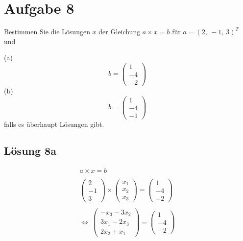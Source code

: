 \renewcommand{\arraystretch}{1.1}

\section{Aufgabe 8}

Bestimmen Sie die Lösungen $\displaystyle x$ der Gleichung $\displaystyle a\times x=b$ für $\displaystyle a=( 2,\ -1,\ 3)^{T}$ und

(a)
\begin{equation*}
  b=\begin{pmatrix}
    1\\
    -4\\
    -2
  \end{pmatrix}
\end{equation*}
(b)
\begin{equation*}
  b=\begin{pmatrix}
    1\\
    -4\\
    -1
  \end{pmatrix}
\end{equation*}
falls es überhaupt Lösungen gibt.

\subsection{Lösung 8a}

\begin{gather*}
  a\times x=b\\
  \\
  \begin{pmatrix}
    2\\
    -1\\
    3
  \end{pmatrix} \times \begin{pmatrix}
    x_{1}\\
    x_{2}\\
    x_{3}
  \end{pmatrix} =\begin{pmatrix}
    1\\
    -4\\
    -2
  \end{pmatrix}\\
  \\
  \Leftrightarrow \ \begin{pmatrix}
    -x_{3} -3x_{2}\\
    3x_{1} -2x_{3}\\
    2x_{2} +x_{1}
  \end{pmatrix} =\begin{pmatrix}
    1\\
    -4\\
    -2
  \end{pmatrix}
\end{gather*}

